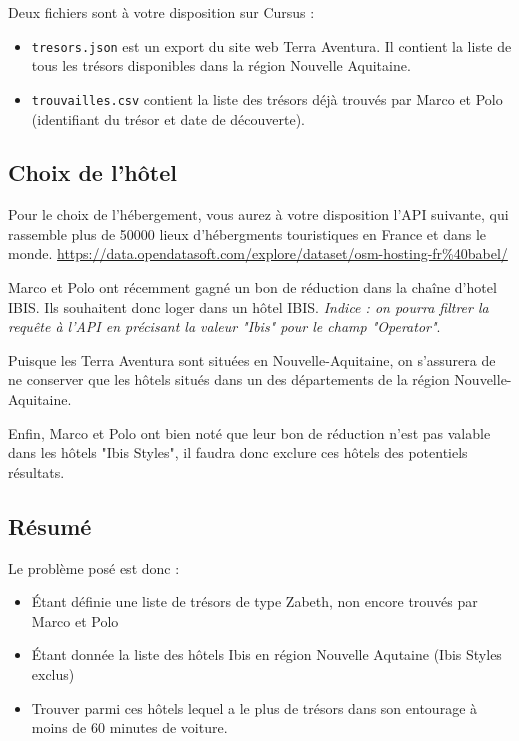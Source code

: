 \documentclass[11pt,a4paper]{article}
\begin{document}
Deux fichiers sont à votre disposition sur Cursus : 
\begin{itemize}
\item \verb+tresors.json+ est un export du site web Terra Aventura. Il contient la liste de tous les trésors disponibles dans la région Nouvelle Aquitaine.
\item \verb+trouvailles.csv+ contient la liste des trésors déjà trouvés par Marco et Polo (identifiant du trésor et date de découverte).
\end{itemize}

\subsection{Choix de l'hôtel}\label{hotel}

Pour le choix de l'hébergement, vous aurez à votre disposition l'API suivante, qui rassemble plus de 50000 lieux d'hébergments touristiques en France et dans le monde. 
\url{https://data.opendatasoft.com/explore/dataset/osm-hosting-fr%40babel/}

Marco et Polo ont récemment gagné un bon de réduction dans la chaîne d'hotel IBIS. Ils souhaitent donc loger dans un hôtel IBIS. \emph{Indice : on pourra filtrer la requête à l'API en précisant la valeur "Ibis" pour le champ "Operator"}.

Puisque les Terra Aventura sont situées en Nouvelle-Aquitaine, on s'assurera de ne conserver que les hôtels situés dans un des départements de la région Nouvelle-Aquitaine. 

Enfin, Marco et Polo ont bien noté que leur bon de réduction n'est pas valable dans les hôtels "Ibis Styles", il faudra donc exclure ces hôtels des potentiels résultats.

\subsection{Résumé}
Le problème posé est donc : 

\begin{itemize}
    \item Étant définie une liste de trésors de type Zabeth, non encore trouvés par Marco et Polo
    \item Étant donnée la liste des hôtels Ibis en région Nouvelle Aqutaine (Ibis Styles exclus)
    \item Trouver parmi ces hôtels lequel a le plus de trésors dans son entourage à moins de 60 minutes de voiture.
\end{itemize}
\end{document}
